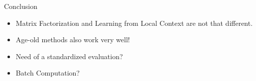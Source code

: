 


\begin{frame}{Conclusion}
  \begin{itemize}[<+->]
  \item Matrix Factorization and Learning from Local Context are not that different.
  \item Age-old methods also work very well!
  \item Need of a standardized evaluation?
  \item Batch Computation?
  \end{itemize}
\end{frame}

